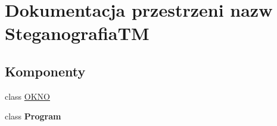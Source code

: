 \hypertarget{namespace_steganografia_t_m}{}\section{Dokumentacja przestrzeni nazw Steganografia\+TM}
\label{namespace_steganografia_t_m}
\subsection*{Komponenty}
\begin{DoxyCompactItemize}
\item 
class \hyperlink{class_steganografia_t_m_1_1_o_k_n_o}{O\+K\+NO}
\item 
class {\bfseries Program}
\end{DoxyCompactItemize}
